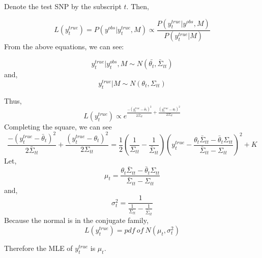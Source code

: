 \documentclass[10pt,a4paper,draft]{article}
\begin{document}
Denote the test SNP by the subscript $t$. Then,

\begin{equation}
L(y_t^{true}) = P(y^{obs} | y_t^{true}, M) \propto \frac{P(y_t^{true}| y^{obs}, M)}{P(y_t^{true} | M)}
\end{equation}
From the above equations, we can see:

\begin{equation}
y_t^{true} | y_t^{obs}, M \sim N(\bar{\theta_t}, \bar{\Sigma}_{tt})
\end{equation}
and,
\begin{equation}
y_t^{true} | M \sim N(\theta_t, \Sigma_{tt})
\end{equation}

Thus,
\begin{equation}
L(y_t^{true}) \propto e^{ \frac{-(y_t^{true} - \bar{\theta}_t)^2}{2\bar{\Sigma}_{tt}} + \frac{(y_t^{true} - \theta_t)^2}{2\Sigma_{tt}} }
\end{equation}
Completing the square, we can see
\begin{equation}
\frac{-(y_t^{true} - \bar{\theta}_t)^2}{2\bar{\Sigma}_{tt}} + \frac{(y_t^{true} - \theta_t)^2}{2\Sigma_{tt}} = \frac{1}{2}(\frac{1}{\Sigma_{tt}} - \frac{1}{\bar{\Sigma}_{tt}}) (y_t^{true} - \frac{\theta_t\bar{\Sigma}_{tt} - \bar{\theta}_t\Sigma_{tt}}{\bar{\Sigma}_{tt}-\Sigma_{tt}})^2 + K
\end{equation}
Let,
\begin{equation}
\mu_t = \frac{\theta_t\bar{\Sigma}_{tt} - \bar{\theta}_t\Sigma_{tt}}{\bar{\Sigma}_{tt}-\Sigma_{tt}}
\end{equation}
and,
\begin{equation}
\sigma^2_t = \frac{1}{\frac{1}{\Sigma_{tt}} - \frac{1}{\bar{\Sigma}_{tt}}}
\end{equation}
Because the normal is in the conjugate family,
\begin{equation}
L(y_t^{true}) = pdf \ of \ N(\mu_t, \sigma^2_t)
\end{equation}

Therefore the MLE of $y_t^{true}$ is $\mu_t$.

\end{document}

